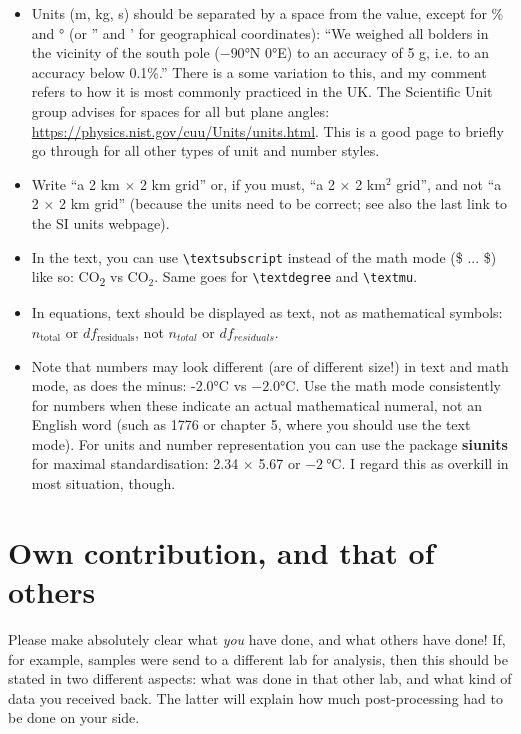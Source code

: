 \begin{itemize}
\item Units (m, kg, s) should be separated by a space from the value, except for \% and ° (or '' and ' for geographical coordinates): ``We weighed all bolders in the vicinity of the south pole ($-90$°N $0$°E) to an accuracy of 5 g, i.e. to an accuracy below 0.1\%.'' There is a some variation to this, and my comment refers to how it is most commonly practiced in the UK. The Scientific Unit group advises for spaces for all but plane angles: \url{https://physics.nist.gov/cuu/Units/units.html}. This is a good page to briefly go through for all other types of unit and number styles.

\item Write ``a 2 km $\times$ 2 km grid'' or, if you must, ``a 2 $\times$ 2 km$^2$ grid'', and not ``a 2 $\times$ 2 km grid'' (because the units need to be correct; see also the last link to the SI units webpage).

\item In the text, you can use \texttt{\textbackslash textsubscript} instead of the math mode (\$ ... \$) like so: CO\textsubscript{2} vs CO$_2$. Same goes for \texttt{\textbackslash textdegree} and \texttt{\textbackslash textmu}.

\item In equations, text should be displayed as text, not as mathematical symbols: $n_\text{total}$ or $df_\text{residuals}$, not $n_{total}$ or $df_{residuals}$.

\item Note that numbers may look different (are of different size!) in text and math mode, as does the minus: -2.0°C vs $-2.0$°C. Use the math mode consistently for numbers when these indicate an actual mathematical numeral, not an English word (such as 1776 or chapter 5, where you should use the text mode). For units and number representation you can use the package \textbf{siunits} for maximal standardisation: \num{2.34} $\times$ \num{5.67} or $\SI{-2}{\celsius}$. I regard this as overkill in most situation, though.
\end{itemize}  
 
\section{Own contribution, and that of others}
Please make absolutely clear what \emph{you} have done, and what others have done! If, for example, samples were send to a different lab for analysis, then this should be stated in two different aspects: what was done in that other lab, and what kind of data you received back. The latter will explain how much post-processing had to be done on your side.

